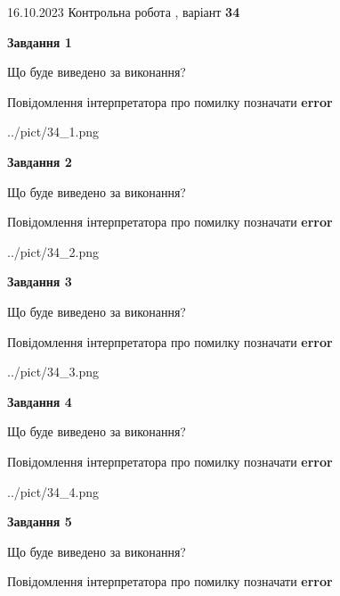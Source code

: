 \documentclass[12pt, ukrainian]{article}
\begin{document}
{\Large{16.10.2023 Контрольна робота , варіант  \No \textbf { 34 }\par}}
{
\begin {large}
{\begin {center}\textbf{Завдання 1}\end {center}}\par
Що буде виведено за виконання? \par
Повідомлення інтерпретатора про помилку позначати \textbf{error}

\begin{center}
	{../pict/34_1.png}
\end{center}
\newpage

{\begin {center}\textbf{Завдання 2}\end {center}}\par
Що буде виведено за виконання? \par
Повідомлення інтерпретатора про помилку позначати \textbf{error}

\begin{center}
	{../pict/34_2.png}
\end{center}
\newpage

{\begin {center}\textbf{Завдання 3}\end {center}}\par
Що буде виведено за виконання? \par
Повідомлення інтерпретатора про помилку позначати \textbf{error}

\begin{center}
	{../pict/34_3.png}
\end{center}
\newpage

{\begin {center}\textbf{Завдання 4}\end {center}}\par
Що буде виведено за виконання? \par
Повідомлення інтерпретатора про помилку позначати \textbf{error}

\begin{center}
	{../pict/34_4.png}
\end{center}
\newpage

{\begin {center}\textbf{Завдання 5}\end {center}}\par
Що буде виведено за виконання? \par
Повідомлення інтерпретатора про помилку позначати \textbf{error}


\end{large}}
\end{document}
